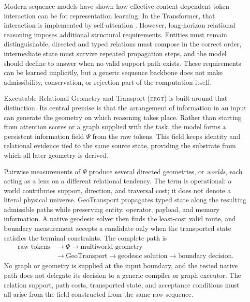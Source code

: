 \documentclass[11pt]{article}
\newcommand{\ERGT}{\textsc{ergt}}
\begin{document}
Modern sequence models have shown how effective content-dependent token
interaction can be for representation learning. In the Transformer, that
interaction is implemented by self-attention \cite{vaswani2017attention}.
However, long-horizon relational reasoning imposes additional structural
requirements. Entities must remain distinguishable, directed and typed
relations must compose in the correct order, intermediate state must survive
repeated propagation steps, and the model should decline to answer when no
valid support path exists. These requirements can be learned implicitly, but a
generic sequence backbone does not make admissibility, conservation, or
rejection part of the computation itself.

Executable Relational Geometry and Transport (\ERGT) is built around that
distinction. Its central premise is that the arrangement of information in an
input can generate the geometry on which reasoning takes place. Rather than
starting from attention scores or a graph supplied with the task, the model
forms a persistent information field $\Psi$ from the raw tokens. This field
keeps identity and relational evidence tied to the same source state, providing
the substrate from which all later geometry is derived.

Pairwise measurements of $\Psi$ produce several directed geometries, or
\emph{worlds}, each acting as a lens on a different relational tendency. The
term is operational: a world contributes support, direction, and traversal
cost; it does not denote a literal physical universe. GeoTransport propagates
typed state along the resulting admissible paths while preserving entity,
operator, payload, and memory information. A native geodesic solver then finds
the least-cost valid route, and boundary measurement accepts a candidate only
when the transported state satisfies the terminal constraints. The complete
path is
\[
\begin{aligned}
  \text{raw tokens}
  &\longrightarrow \Psi
  \longrightarrow \text{multiworld geometry} \\
  &\longrightarrow \text{GeoTransport}
  \longrightarrow \text{geodesic solution}
  \longrightarrow \text{boundary decision}.
\end{aligned}
\]
No graph or geometry is supplied at the input boundary, and the tested native
path does not delegate its decision to a generic compiler or graph executor.
The relation support, path costs, transported state, and acceptance conditions
must all arise from the field constructed from the same raw sequence.
\end{document}
